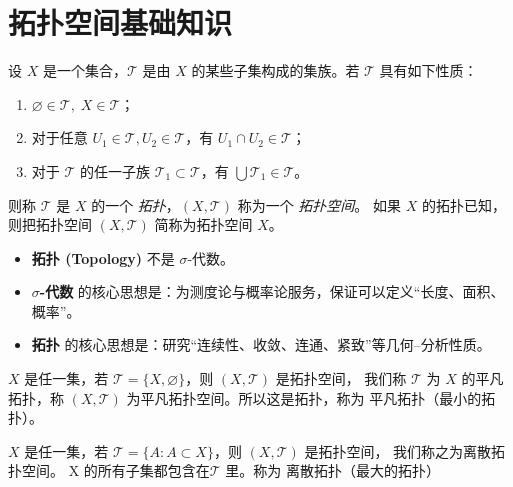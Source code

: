 \chapter{拓扑空间基础知识}
\begin{definition}[拓扑]
设 $X$ 是一个集合，$\mathcal{T}$ 是由 $X$ 的某些子集构成的集族。若 $\mathcal{T}$ 具有如下性质：
\begin{enumerate}
  \item $\varnothing \in \mathcal{T},\; X \in \mathcal{T}$；
  \item 对于任意 $U_1 \in \mathcal{T}, U_2 \in \mathcal{T}$，有 $U_1 \cap U_2 \in \mathcal{T}$；
  \item 对于 $\mathcal{T}$ 的任一子族 $\mathcal{T}_1 \subset \mathcal{T}$，有 $\bigcup \mathcal{T}_1 \in \mathcal{T}$。
\end{enumerate}

则称 $\mathcal{T}$ 是 $X$ 的一个 \emph{拓扑}，$(X,\mathcal{T})$ 称为一个 \emph{拓扑空间}。  
如果 $X$ 的拓扑已知，则把拓扑空间 $(X,\mathcal{T})$ 简称为拓扑空间 $X$。
\end{definition}
\begin{itemize}
  \item \textbf{拓扑 (Topology)} 不是 $\sigma$-代数。
  \item \textbf{$\sigma$-代数} 的核心思想是：为测度论与概率论服务，保证可以定义“长度、面积、概率”。
  \item \textbf{拓扑} 的核心思想是：研究“连续性、收敛、连通、紧致”等几何--分析性质。
\end{itemize}
\begin{example}[平凡拓扑]
$X$ 是任一集，若 $\mathcal{T} = \{X,\varnothing\}$，则 $(X,\mathcal{T})$ 是拓扑空间， 
我们称 $\mathcal{T}$ 为 $X$ 的平凡拓扑，称 $(X,\mathcal{T})$ 为平凡拓扑空间。所以这是拓扑，称为 平凡拓扑（最小的拓扑）。
\end{example}

\begin{example}[离散拓扑空间]
$X$ 是任一集，若 $\mathcal{T} = \{A : A \subset X\}$，则 $(X,\mathcal{T})$ 是拓扑空间，
我们称之为离散拓扑空间。 X 的所有子集都包含在$ \mathcal{T}$ 里。称为 离散拓扑（最大的拓扑）
\end{example}


